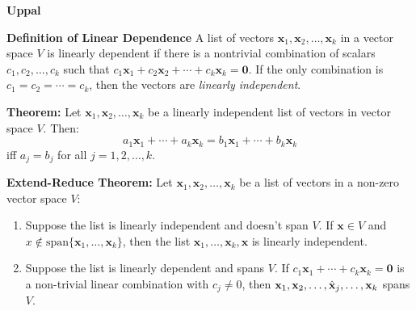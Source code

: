 \documentclass{article}
\newcommand{\bff}[1]{\mathbf{#1}}
\newcommand{\spann}[1]{\mathrm{span}\{#1\}}
\begin{document}
    \begin{minipage}[t]{.45\textwidth} %
        \begin{center}
            \textbf{Uppal}
        \end{center}
        \textbf{Definition of Linear Dependence} A list of vectors $\bff{x}_1, \bff{x}_2, \dots, \bff{x}_k$ in a vector space $V$ is linearly dependent if there is a nontrivial combination of scalars $c_1,c_2,\dots, c_k$ such that $c_1\bff{x}_1+c_2\bff{x}_2+\cdots+c_k\bff{x}_k=\bff{0}$. If the only combination is $c_1=c_2=\cdots =c_k$, then the vectors are \textit{linearly independent}.
        \vspace{2mm}

        \textbf{Theorem:} Let $\bff{x}_1, \bff{x}_2,\dots,\bff{x}_k$ be a linearly independent list of vectors in vector space $V$. Then:
        \begin{equation*}
            a_1\bff{x}_1 + \cdots + a_k\bff{x}_k = b_1\bff{x}_1+ \cdots + b_k\bff{x}_k
        \end{equation*}
        iff $a_j = b_j$ for all $j=1,2,\dots,k.$
        \vspace{2mm}

        \textbf{Extend-Reduce Theorem:} Let $\bff{x}_1, \bff{x}_2, \dots, \bff{x}_k$ be a list of vectors in a non-zero vector space $V$:
        \begin{enumerate}[label=(\alph*)]
            \item Suppose the list is linearly independent and doesn't span $V$. If $\bff{x} \in V$ and $x \notin \spann{\bff{x}_1, \dots, \bff{x}_k}$, then the list $\bff{x}_1, \dots,\bff{x}_k,\bff{x}$ is linearly independent.
            \item Suppose the list is linearly dependent and spans $V$. If $c_1\bff{x}_1+\cdots+c_k\bff{x}_k=\bff{0}$ is a non-trivial linear combination with $c_j \neq 0$, then $\bff{x}_1,\bff{x}_2,\dots,\hat{\bf{x}}_j,\dots, \bff{x}_k$ spans $V$.
        \end{enumerate}
    \end{minipage}\newpage
\end{document}
